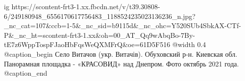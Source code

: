  
 
 
 
 

\ifcmt
  ig https://scontent-frt3-1.xx.fbcdn.net/v/t39.30808-6/249180948_6556170617756483_1188524235023136236_n.jpg?_nc_cat=107&ccb=1-5&_nc_sid=b9115d&_nc_ohc=Y520SUb4SbkAX-CTf-P&_nc_ht=scontent-frt3-1.xx&oh=00_AT_Qq9wAbqBo-7By-tE7z6WppTospFJaoHbFqsWeQXMFrQ&oe=61D5F516
  @width 0.4
  @caption_begin
    Село Витачов (укр. Витачів). Обуховский р-н. Киевская обл. 
    Панорамная площадка - «КРАСОВИД» над Днепром. Фото октябрь 2021 года.
  @caption_end
\fi
